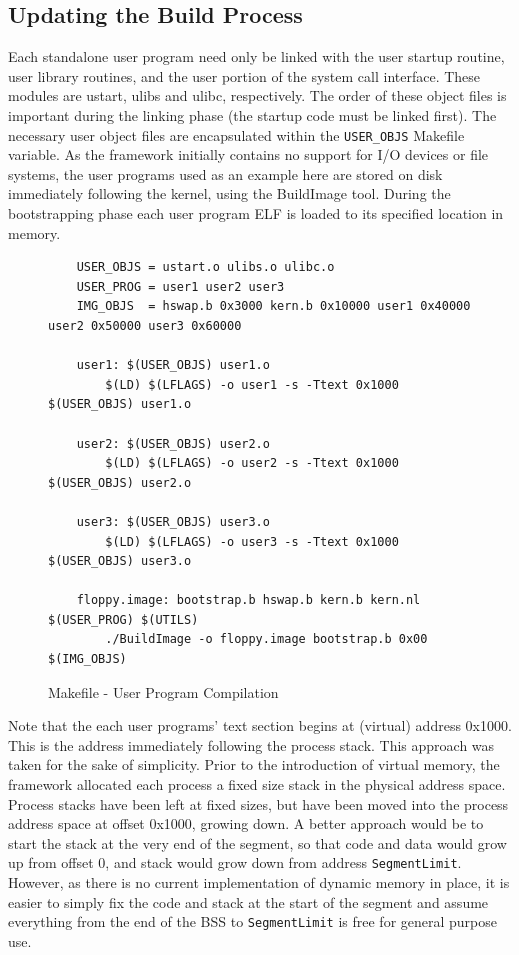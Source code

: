 \documentclass[titlepage]{article}
\begin{document}
\subsection{Updating the Build Process}

Each standalone user program need only be linked with the user startup routine,
user library routines, and the user portion of the system call interface. These
modules are ustart, ulibs and ulibc, respectively. The order of these object
files is important during the linking phase (the startup code must be linked
first). The necessary user object files are encapsulated within the
\verb!USER_OBJS! Makefile variable. As the framework initially contains no
support for I/O devices or file systems, the user programs used as an example
here are stored on disk immediately following the kernel, using the BuildImage
tool. During the bootstrapping phase each user program ELF is loaded to its
specified location in memory.

\begin{figure}[!ht]
\begin{verbatim}
    USER_OBJS = ustart.o ulibs.o ulibc.o
    USER_PROG = user1 user2 user3
    IMG_OBJS  = hswap.b 0x3000 kern.b 0x10000 user1 0x40000 user2 0x50000 user3 0x60000

    user1: $(USER_OBJS) user1.o
        $(LD) $(LFLAGS) -o user1 -s -Ttext 0x1000 $(USER_OBJS) user1.o

    user2: $(USER_OBJS) user2.o
        $(LD) $(LFLAGS) -o user2 -s -Ttext 0x1000 $(USER_OBJS) user2.o

    user3: $(USER_OBJS) user3.o
        $(LD) $(LFLAGS) -o user3 -s -Ttext 0x1000 $(USER_OBJS) user3.o

    floppy.image: bootstrap.b hswap.b kern.b kern.nl $(USER_PROG) $(UTILS)
        ./BuildImage -o floppy.image bootstrap.b 0x00 $(IMG_OBJS)
\end{verbatim}
\caption{Makefile - User Program Compilation}
\end{figure}

Note that the each user programs' text section begins at (virtual) address
0x1000. This is the address immediately following the process stack. This
approach was taken for the sake of simplicity. Prior to the introduction of
virtual memory, the framework allocated each process a fixed size stack in
the physical address space. Process stacks have been left at fixed sizes, but
have been moved into the process address space at offset 0x1000, growing down.
A better approach would be to start the stack at the very end of the segment,
so that code and data would grow up from offset 0, and stack would grow down
from address \verb!SegmentLimit!. However, as there is no current implementation
of dynamic memory in place, it is easier to simply fix the code and stack
at the start of the segment and assume everything from the end of the BSS to
\verb!SegmentLimit! is free for general purpose use.
\end{document}

